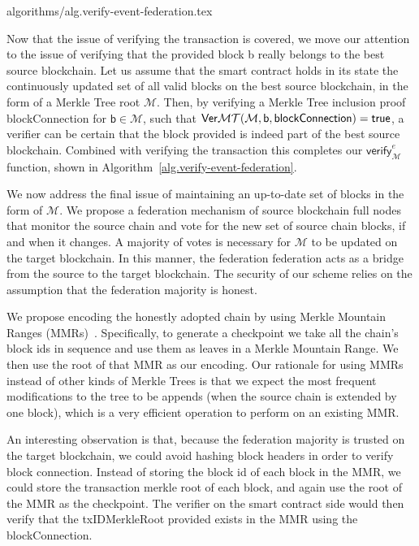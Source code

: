 {algorithms/alg.verify-event-federation.tex}

Now that the issue of verifying the transaction is covered, we move our attention to the issue of verifying that the provided block \textsf{b} really belongs to the best source blockchain. Let us assume that the smart contract holds in its state the continuously updated set of all valid blocks on the best source blockchain, in the form of a Merkle Tree root $\mathcal{M}$. Then, by verifying a Merkle Tree inclusion proof \textsf{blockConnection} for $\textsf{b} \in \mathcal{M}$, such that $\mathsf{Ver}\mathcal{MT}(\mathcal{M}, \textsf{b}, \textsf{blockConnection}) = \mathsf{true}$, a verifier can be certain that the block provided is indeed part of the best source blockchain. Combined with verifying the transaction this completes our $\textsf{verify}_\mathcal{M}^e$ function, shown in Algorithm~\ref{alg.verify-event-federation}.

We now address the final issue of maintaining an up-to-date set of blocks in the form of $\mathcal{M}$. We propose a federation mechanism of source blockchain full nodes that monitor the source chain and vote for the new set of source chain blocks, if and when it changes. A majority of votes is necessary for $\mathcal{M}$ to be updated on the target blockchain. In this manner, the federation federation acts as a bridge from the source to the target blockchain. The security of our scheme relies on the assumption that the federation majority is honest.

We propose encoding the honestly adopted chain by using Merkle Mountain Ranges (MMRs)~\cite{flyclient}. Specifically, to generate a checkpoint we take all the chain's block ids in sequence and use them as leaves in a Merkle Mountain Range. We then use the root of that MMR as our encoding. Our rationale for using MMRs instead of other kinds of Merkle Trees is that we expect the most frequent modifications to the tree to be appends (when the source chain is extended by one block), which is a very efficient operation to perform on an existing MMR.

An interesting observation is that, because the federation majority is trusted on the target blockchain, we could avoid hashing block headers in order to verify block connection. Instead of storing the block id of each block in the MMR, we could store the transaction merkle root of each block, and again use the root of the MMR as the checkpoint. The verifier on the smart contract side would then verify that the \textsf{txIDMerkleRoot} provided exists in the MMR using the \textsf{blockConnection}.

